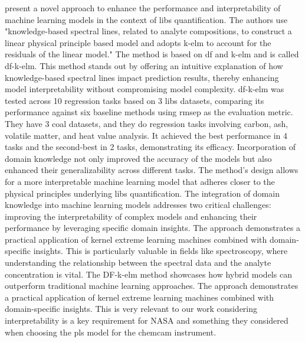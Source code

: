 \citet{song_DF-K-ELM} present a novel approach to enhance the performance and interpretability of machine learning models in the context of \gls{libs} quantification.
The authors use "knowledge-based spectral lines, related to analyte compositions, to construct a linear physical principle based model and adopts \gls{k-elm} to account for the residuals of the linear model."
The method is based on \gls{df} and \gls{k-elm} and is called \gls{df}-\gls{k-elm}.
This method stands out by offering an intuitive explanation of how knowledge-based spectral lines impact prediction results, thereby enhancing model interpretability without compromising model complexity.
\gls{df}-\gls{k-elm} was tested across 10 regression tasks based on 3 \gls{libs} datasets, comparing its performance against six baseline methods using \gls{rmsep} as the evaluation metric.
They have 3 coal datasets, and they do regression tasks involving carbon, ash, volatile matter, and heat value analysis.
It achieved the best performance in 4 tasks and the second-best in 2 tasks, demonstrating its efficacy.
Incorporation of domain knowledge not only improved the accuracy of the models but also enhanced their generalizability across different tasks.
The method's design allows for a more interpretable machine learning model that adheres closer to the physical principles underlying \gls{libs} quantification.
The integration of domain knowledge into machine learning models addresses two critical challenges: improving the interpretability of complex models and enhancing their performance by leveraging specific domain insights.
The approach demonstrates a practical application of kernel extreme learning machines combined with domain-specific insights.
This is particularly valuable in fields like spectroscopy, where understanding the relationship between the spectral data and the analyte concentration is vital.
The DF-\gls{k-elm} method showcases how hybrid models can outperform traditional machine learning approaches.
The approach demonstrates a practical application of kernel extreme learning machines combined with domain-specific insights.
This is very relevant to our work considering interpretability is a key requirement for NASA and something they considered when choosing the \gls{pls} model for the \gls{chemcam} instrument.

